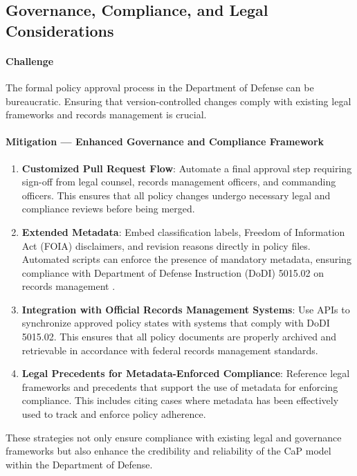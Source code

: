 \documentclass[11pt]{article}
\begin{document}
	\subsection{Governance, Compliance, and Legal Considerations}
	\paragraph{Challenge}
	The formal policy approval process in the Department of Defense can be bureaucratic. Ensuring that version-controlled changes comply with existing legal frameworks and records management is crucial.

	\paragraph{Mitigation --- Enhanced Governance and Compliance Framework}
	\begin{enumerate}
		\item \textbf{Customized Pull Request Flow}: Automate a final approval step requiring sign-off from legal counsel, records management officers, and commanding officers. This ensures that all policy changes undergo necessary legal and compliance reviews before being merged.
		\item \textbf{Extended Metadata}: Embed classification labels, Freedom of Information Act (FOIA) disclaimers, and revision reasons directly in policy files. Automated scripts can enforce the presence of mandatory metadata, ensuring compliance with Department of Defense Instruction (DoDI) 5015.02 on records management \cite{DoDI5015.02}.
		\item \textbf{Integration with Official Records Management Systems}: Use APIs to synchronize approved policy states with systems that comply with DoDI 5015.02. This ensures that all policy documents are properly archived and retrievable in accordance with federal records management standards.
		\item \textbf{Legal Precedents for Metadata-Enforced Compliance}: Reference legal frameworks and precedents that support the use of metadata for enforcing compliance. This includes citing cases where metadata has been effectively used to track and enforce policy adherence.
	\end{enumerate}

	These strategies not only ensure compliance with existing legal and governance frameworks but also enhance the credibility and reliability of the CaP model within the Department of Defense.
\end{document}
